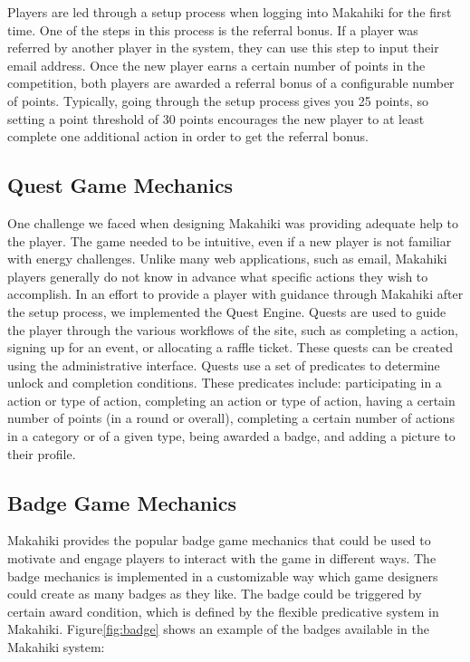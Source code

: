 Players are led through a setup process when logging into Makahiki for the first time. One of the steps in this process is the referral bonus. If a player was referred by another player in the system, they can use this step to input their email address. Once the new player earns a certain number of points in the competition, both players are awarded a referral bonus of a configurable number of points. Typically, going through the setup process gives you 25 points, so setting a point threshold of 30 points encourages the new player to at least complete one additional action in order to get the referral bonus.

\subsection{Quest Game Mechanics}

One challenge we faced when designing Makahiki was providing adequate help to the player. The game needed to be intuitive, even if a new player is not familiar with energy challenges. Unlike many web applications, such as email, Makahiki players generally do not know in advance what specific actions they wish to accomplish. In an effort to provide a player with guidance through Makahiki after the setup process, we implemented the Quest Engine. Quests are used to guide the player through the various workflows of the site, such as completing a action, signing up for an event, or allocating a raffle ticket. These quests can be created using the administrative interface. Quests use a set of predicates to determine unlock and completion conditions. These predicates include: participating in a action or type of action, completing an action or type of action, having a certain number of points (in a round or overall), completing a certain number of actions in a category or of a given type, being awarded a badge, and adding a picture to their profile.

\subsection{Badge Game Mechanics}

Makahiki provides the popular badge game mechanics that could be used to motivate and engage players to interact with the game in different ways. The badge mechanics is implemented in a customizable way which game designers could create as many badges as they like. The badge could be triggered by certain award condition, which is defined by the flexible predicative system in Makahiki. Figure\ref{fig:badge} shows an example of the badges available in the Makahiki system:

